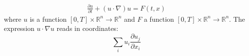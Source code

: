 \documentclass[17pt]{extarticle}
\begin{document}
\begin{align*}
	\frac{\partial{u}}{\partial{t}}+(u\cdot\nabla) u=F(t,x)
\end{align*}
where $u$ is a function $[0,T]\times\mathbb{R}^n\rightarrow\mathbb{R}^n$ and
$F$ a function $[0,T]\times\mathbb{R}^n\rightarrow\mathbb{R}^n$.
The expression $u\cdot\nabla u$ reads in coordinates:
$$
\sum_iu_i\frac{\partial u_j}{\partial x_i}
$$
\end{document}
